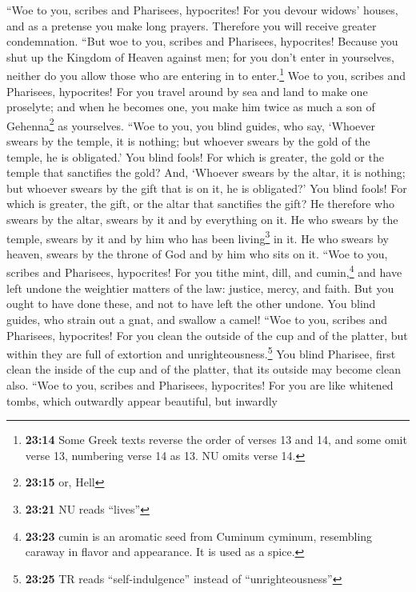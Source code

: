  ``Woe to you, scribes and Pharisees, hypocrites! For you
devour widows' houses, and as a pretense you make long prayers.
Therefore you will receive greater condemnation.  ``But
woe to you, scribes and Pharisees, hypocrites! Because you shut up the
Kingdom of Heaven against men; for you don't enter in yourselves,
neither do you allow those who are entering in to enter.\footnote{\textbf{23:14}
  Some Greek texts reverse the order of verses 13 and 14, and some omit
  verse 13, numbering verse 14 as 13. NU omits verse 14.}
 Woe to you, scribes and Pharisees, hypocrites! For you
travel around by sea and land to make one proselyte; and when he becomes
one, you make him twice as much a son of Gehenna\footnote{\textbf{23:15}
  or, Hell} as yourselves.  ``Woe to you, you blind
guides, who say, `Whoever swears by the temple, it is nothing; but
whoever swears by the gold of the temple, he is obligated.'
 You blind fools! For which is greater, the gold or the
temple that sanctifies the gold?  And, `Whoever swears by
the altar, it is nothing; but whoever swears by the gift that is on it,
he is obligated?'  You blind fools! For which is greater,
the gift, or the altar that sanctifies the gift?  He
therefore who swears by the altar, swears by it and by everything on it.
 He who swears by the temple, swears by it and by him who
has been living\footnote{\textbf{23:21} NU reads ``lives''} in it.
 He who swears by heaven, swears by the throne of God and
by him who sits on it.  ``Woe to you, scribes and
Pharisees, hypocrites! For you tithe mint, dill, and cumin,\footnote{\textbf{23:23}
  cumin is an aromatic seed from Cuminum cyminum, resembling caraway in
  flavor and appearance. It is used as a spice.} and have left undone
the weightier matters of the law: justice, mercy, and faith. But you
ought to have done these, and not to have left the other undone.
 You blind guides, who strain out a gnat, and swallow a
camel!  ``Woe to you, scribes and Pharisees, hypocrites!
For you clean the outside of the cup and of the platter, but within they
are full of extortion and unrighteousness.\footnote{\textbf{23:25} TR
  reads ``self-indulgence'' instead of ``unrighteousness''}
 You blind Pharisee, first clean the inside of the cup
and of the platter, that its outside may become clean also.
 ``Woe to you, scribes and Pharisees, hypocrites! For you
are like whitened tombs, which outwardly appear beautiful, but inwardly
